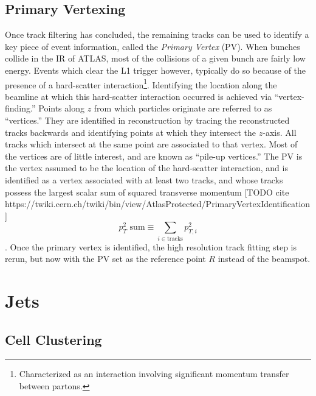         \FloatBarrier
        \subsection{Primary Vertexing}

            Once track filtering has concluded,
                the remaining tracks can be used to identify a key piece of event information, 
                called the \textit{Primary Vertex} (PV).
            When bunches collide in the IR of ATLAS, most of the collisions of a given bunch are fairly low energy.
            Events which clear the L1 trigger however, typically do so because of the presence of a hard-scatter interaction\footnote{
                Characterized as an interaction involving significant momentum transfer between partons.}.
            Identifying the location along the beamline at which this hard-scatter interaction occurred is achieved via ``vertex-finding.''
            Points along $z$ from which particles originate are referred to as ``vertices.''
            They are identified in reconstruction by tracing the reconstructed tracks backwards
                and identifying points at which they intersect the $z$-axis.
            All tracks which intersect at the same point are associated to that vertex.
            Most of the vertices are of little interest, and are known as ``pile-up vertices.''
            The PV is the vertex assumed to be the location of the hard-scatter interaction,
                and is identified as a vertex associated with at least two tracks,
                and whose tracks possess the largest scalar sum of squared transverse momentum\cite{jet_energy_scale13TeV}
                [TODO cite https://twiki.cern.ch/twiki/bin/view/AtlasProtected/PrimaryVertexIdentification]
                \begin{equation}
                    p_T^2 \textrm{ sum}  \equiv \sum\limits_{i \in \textrm{tracks}} p_{T,i}^2
                \end{equation}.
            Once the primary vertex is identified, the high resolution track fitting step is rerun,
                but now with the PV set as the reference point $R$ instead of the beamspot.


    \FloatBarrier
    \section{Jets}

        \subsection{Cell Clustering}

